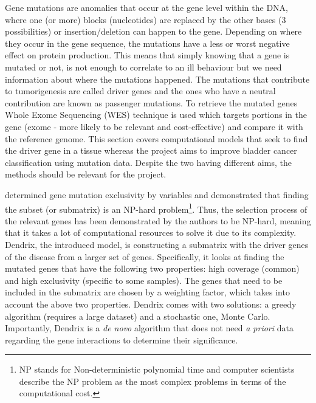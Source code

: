 Gene mutations are anomalies that occur at the gene level within the DNA, where one (or more) blocks (nucleotides) are replaced by the other bases (3 possibilities) or insertion/deletion can happen to the gene. Depending on where they occur in the gene sequence, the mutations have a less or worst negative effect on protein production. This means that simply knowing that a gene is mutated or not, is not enough to correlate to an ill behaviour but we need information about where the mutations happened. The mutations that contribute to tumorigenesis are called driver genes and the ones who have a neutral contribution are known as passenger mutations\cite{Ciriello2012-hi}. To retrieve the mutated genes Whole Exome Sequencing (WES) technique is used which targets portions in the gene (exome - more likely to be relevant and cost-effective) and compare it with the reference genome\cite{Schneider2016-ml}. This section covers computational models that seek to find the driver gene in a tissue whereas the project aims to improve bladder cancer classification using mutation data. Despite the two having different aims, the methods should be relevant for the project.

\citet{Vandin2012-cf} determined gene mutation exclusivity by variables and demonstrated that finding the subset (or submatrix) is an NP-hard problem\footnote{ NP stands for Non-deterministic polynomial time and computer scientists describe the NP problem as the most complex problems in terms of the computational cost.}. Thus, the selection process of the relevant genes has been demonstrated by the authors to be NP-hard, meaning that it takes a lot of computational resources to solve it due to its complexity. Dendrix, the introduced model, is constructing a submatrix with the driver genes of the disease from a larger set of genes. Specifically, it looks at finding the mutated genes that have the following two properties: high coverage (common) and high exclusivity (specific to some samples). The genes that need to be included in the submatrix are chosen by a weighting factor, which takes into account the above two properties. Dendrix comes with two solutions: a greedy algorithm (requires a large dataset) and a stochastic one, Monte Carlo. Importantly, Dendrix is a \textit{de novo} algorithm that does not need \textit{a priori} data regarding the gene interactions to determine their significance.

